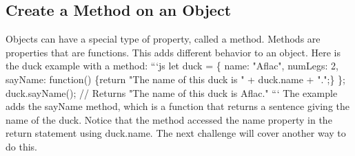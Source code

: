 \documentclass{article}%
\begin{document}
%
\subsection{Create a Method on an Object}%
\label{subsec:CreateaMethodonanObject}%
Objects can have a special type of property, called a method.\newline%
Methods are properties that are functions. This adds different behavior to an object. Here is the duck example with a method:\newline%
```js\newline%
let duck = \{\newline%
  name: "Aflac",\newline%
  numLegs: 2,\newline%
  sayName: function() \{return "The name of this duck is " + duck.name + ".";\}\newline%
\};\newline%
duck.sayName();\newline%
// Returns "The name of this duck is Aflac."\newline%
```\newline%
The example adds the sayName method, which is a function that returns a sentence giving the name of the duck.\newline%
Notice that the method accessed the name property in the return statement using duck.name. The next challenge will cover another way to do this.\newline%

%
\end{document}
